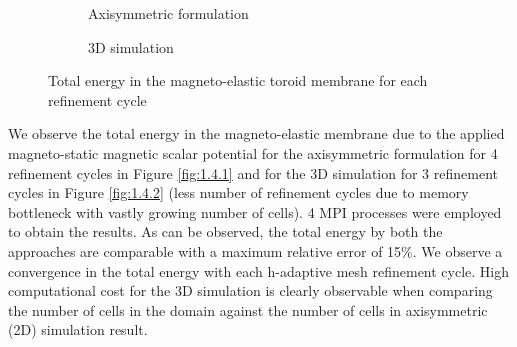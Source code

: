 \begin{figure}[t!]
\begin{subfigure}[t]{0.49\linewidth}
\centering
{}
\caption{Axisymmetric formulation}
\label{fig:1.4.1}
\end{subfigure}
\begin{subfigure}[t]{0.46\linewidth}
\centering
{}
\caption{3D simulation}
\label{fig:1.4.2}
\end{subfigure}
\caption{Total energy in the magneto-elastic toroid membrane for each refinement cycle}
\label{fig:1.4}
\end{figure} \par 

We observe the total energy in the magneto-elastic membrane due to the applied magneto-static magnetic scalar potential for the axisymmetric formulation for 4 refinement cycles in Figure \eqref{fig:1.4.1} and for the 3D simulation for 3 refinement cycles in Figure \eqref{fig:1.4.2} (less number of refinement cycles due to memory bottleneck with vastly growing number of cells). 4 MPI processes were employed to obtain the results. As can be observed, the total energy by both the approaches are comparable with a maximum relative error of 15\%. We observe a convergence in the total energy with each h-adaptive mesh refinement cycle. High computational cost for the 3D simulation is clearly observable when comparing the number of cells in the domain against the number of cells in axisymmetric (2D) simulation result. \par 

